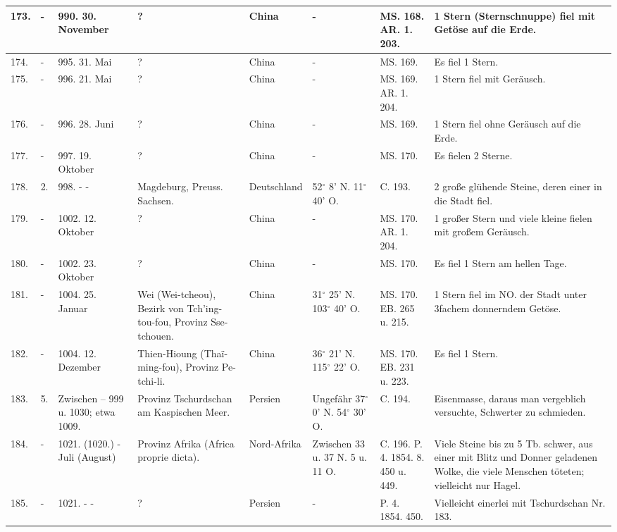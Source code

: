 \documentclass[a4paper, 11pt, oneside, polutonikogreek, german]{article}
\begin{document}
\begin{table}[!ht]
\begin{tabular}{|l|l|l|l|l|l|l|l|}
        173. & - & 990. 30. November & ? & China & - & MS. 168. AR. 1. 203. & 1 Stern (Sternschnuppe) fiel mit Getöse auf die Erde. \\ \hline
        174. & - & 995. 31. Mai & ? & China & - & MS. 169. & Es fiel 1 Stern. \\ \hline
        175. & - & 996. 21. Mai & ? & China & - & MS. 169. AR. 1. 204. & 1 Stern fiel mit Geräusch. \\ \hline
        176. & - & 996. 28. Juni & ? & China & - & MS. 169. & 1 Stern fiel ohne Geräusch auf die Erde. \\ \hline
        177. & - & 997. 19. Oktober & ? & China & - & MS. 170. & Es fielen 2 Sterne. \\ \hline
        178. & 2. & 998. - - & Magdeburg, Preuss. Sachsen. & Deutschland & 52$^\circ$ 8' N. 11$^\circ$ 40' O. & C. 193. & 2 große glühende Steine, deren einer in die Stadt fiel. \\ \hline
        179. & - & 1002. 12. Oktober & ? & China & - & MS. 170. AR. 1. 204. & 1 großer Stern und viele kleine fielen mit großem Geräusch. \\ \hline
        180. & - & 1002. 23. Oktober & ? & China & - & MS. 170. & Es fiel 1 Stern am hellen Tage. \\ \hline
        181. & - & 1004. 25. Januar & Wei (Wei-tcheou), Bezirk von Tch’ing-tou-fou, Provinz Sse-tchouen. & China & 31$^\circ$ 25' N. 103$^\circ$ 40' O. & MS. 170. EB. 265 u. 215. & 1 Stern fiel im NO. der Stadt unter 3fachem donnerndem Getöse. \\ \hline
        182. & - & 1004. 12. Dezember & Thien-Hioung (Thaï-ming-fou), Provinz Pe-tchi-li. & China & 36$^\circ$ 21' N. 115$^\circ$ 22' O. & MS. 170. EB. 231 u. 223. & Es fiel 1 Stern. \\ \hline
        183. & 5. & Zwischen – 999 u. 1030; etwa 1009. & Provinz Tschurdschan am Kaspischen Meer. & Persien & Ungefähr 37$^\circ$ 0' N. 54$^\circ$ 30' O. & C. 194. & Eisenmasse, daraus man vergeblich versuchte, Schwerter zu schmieden. \\ \hline
        184. & - & 1021. (1020.) - Juli (August) & Provinz Afrika (Africa proprie dicta). & Nord-Afrika & Zwischen 33 u. 37 N. 5 u. 11 O. & C. 196. P. 4. 1854. 8. 450 u. 449. & Viele Steine bis zu 5 Tb. schwer, aus einer mit Blitz und Donner geladenen Wolke, die viele Menschen töteten; vielleicht nur Hagel. \\ \hline
        185. & - & 1021. - - & ? & Persien & - & P. 4. 1854. 450. & Vielleicht einerlei mit Tschurdschan Nr. 183. \\ \hline

\end{tabular}
\end{table}
\end{document}
